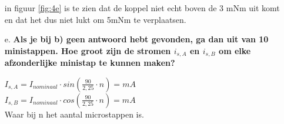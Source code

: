 \begin{enumerate}
        in figuur \ref{fig:4e} is te zien dat de koppel niet echt boven de 3 mNm uit komt en dat het dus niet lukt om 5mNm te verplaatsen.        

    \item [e.] \textbf{Als je bij b) geen antwoord hebt gevonden, ga dan uit van 10 ministappen.
    Hoe groot zijn de stromen $i_{s,A}$ en $i_{s,B}$ om elke afzonderlijke ministap te kunnen
    maken?}
    
        $I_{s,A} = I_{nominaal} \cdot sin(\frac{90}{2,25} \cdot n) = mA$\\
        $I_{s,B} = I_{nominaal} \cdot cos(\frac{90}{2,25} \cdot n) = mA$\\
        Waar bij n het aantal microstappen is.

\end{enumerate}